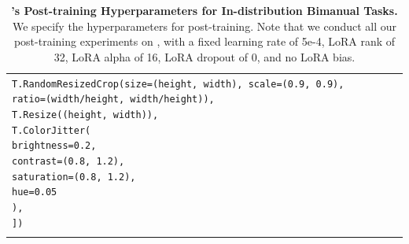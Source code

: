 \begin{table}[!htbp]
\begin{tabular}{l*{3}{>{\centering\arraybackslash}p{2.8cm}}}
{{\texttt{\hspace*{1em}T.RandomResizedCrop(size=(height, width), scale=(0.9, 0.9), ratio=(width/height, width/height)),}\\
\texttt{\hspace*{1em}T.Resize((height, width)),}\\
\texttt{\hspace*{1em}T.ColorJitter(}\\
\texttt{\hspace*{2em}brightness=0.2,}\\
\texttt{\hspace*{2em}contrast=(0.8, 1.2),}\\
\texttt{\hspace*{2em}saturation=(0.8, 1.2),}\\
\texttt{\hspace*{2em}hue=0.05}\\
\texttt{\hspace*{1em}),}\\
\texttt{])}
}} \\
\addlinespace[4pt]  
\bottomrule
\end{tabular}
\caption{\textbf{\molmoact's Post-training Hyperparameters for In-distribution Bimanual Tasks.} We specify the hyperparameters for \molmoact post-training. Note that we conduct all our post-training experiments on \molmoactd, with a fixed learning rate of 5e-4, LoRA rank of 32, LoRA alpha of 16, LoRA dropout of 0, and no LoRA bias.}
\label{tab:hyperparams_real_indist_bimanual}
\end{table}